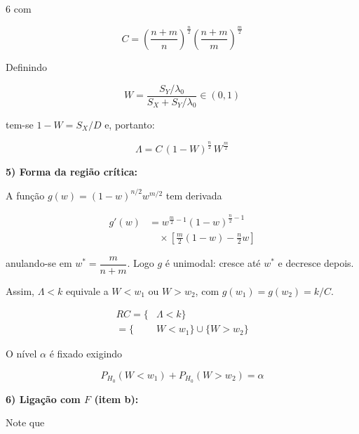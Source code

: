 \documentclass[8pt, a4paper, landscape]{extarticle}
\begin{document}
\begin{multicols}{6}
com

\begin{equation*}
C = \left(\frac{n+m}{n}\right)^{\frac{n}{2}}\left(\frac{n+m}{m}\right)^{\frac{m}{2}}
\end{equation*}

Definindo

\begin{equation*}
W = \frac{S_Y/\lambda_0}{S_X + S_Y/\lambda_0} \in (0,1)
\end{equation*}

tem-se $1-W = S_X/D$ e, portanto:

\begin{equation*}
\Lambda = C\,(1-W)^{\frac{n}{2}}\,W^{\frac{m}{2}}
\end{equation*}

\vspace{0.2cm}

\textbf{5) Forma da região crítica:}

A função $g(w) = (1-w)^{n/2}w^{m/2}$ tem derivada

\begin{equation*}
\begin{split}
g'(w) &= w^{\frac{m}{2}-1}(1-w)^{\frac{n}{2}-1} \\
&\quad \times \left[\frac{m}{2}(1-w) - \frac{n}{2}w\right]
\end{split}
\end{equation*}

anulando-se em $w^* = \dfrac{m}{n+m}$. Logo $g$ é unimodal: cresce até $w^*$ e decresce depois.

Assim, $\Lambda < k$ equivale a $W < w_1$ ou $W > w_2$, com $g(w_1) = g(w_2) = k/C$.

\begin{equation*}
\begin{split}
RC = \{&\Lambda < k\} \\
= \{&W < w_1\} \cup \{W > w_2\}
\end{split}
\end{equation*}

O nível $\alpha$ é fixado exigindo

\begin{equation*}
P_{H_0}(W < w_1) + P_{H_0}(W > w_2) = \alpha
\end{equation*}

\vspace{0.2cm}

\textbf{6) Ligação com $F$ (item b):}

Note que


\end{multicols}
\end{document}
